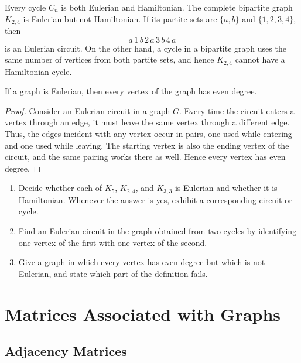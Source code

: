 \begin{Example}
Every cycle $C_n$ is both Eulerian and Hamiltonian. The complete bipartite graph $K_{2,4}$ is Eulerian but not Hamiltonian. If its partite sets are $\{a,b\}$ and $\{1,2,3,4\}$, then
\begin{equation*}
a\,1\,b\,2\,a\,3\,b\,4\,a
\end{equation*}
is an Eulerian circuit. On the other hand, a cycle in a bipartite graph uses the same number of vertices from both partite sets, and hence $K_{2,4}$ cannot have a Hamiltonian cycle.
\end{Example}

\begin{Theorem}
If a graph is Eulerian, then every vertex of the graph has even degree.
\end{Theorem}

\begin{proof}
Consider an Eulerian circuit in a graph $G$. Every time the circuit enters a vertex through an edge, it must leave the same vertex through a different edge. Thus, the edges incident with any vertex occur in pairs, one used while entering and one used while leaving. The starting vertex is also the ending vertex of the circuit, and the same pairing works there as well. Hence every vertex has even degree.
\end{proof}

\begin{Exercise}
\begin{enumerate}
\item Decide whether each of $K_5$, $K_{2,4}$, and $K_{3,3}$ is Eulerian and whether it is Hamiltonian. Whenever the answer is yes, exhibit a corresponding circuit or cycle.
\item Find an Eulerian circuit in the graph obtained from two cycles by identifying one vertex of the first with one vertex of the second.
\item Give a graph in which every vertex has even degree but which is not Eulerian, and state which part of the definition fails.
\end{enumerate}
\end{Exercise}

\section{Matrices Associated with Graphs}\label{sec:GraphMatrices}

\subsection{Adjacency Matrices}


